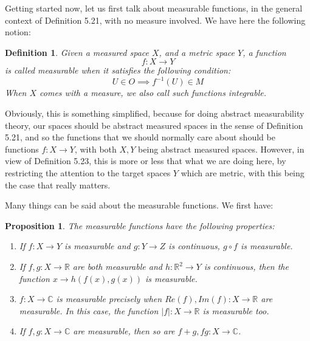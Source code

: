 \documentclass[12pt]{amsbook}
\newtheorem{definition}[theorem]{Definition}
\newtheorem{proposition}[theorem]{Proposition}
\begin{document}
\bigskip

Getting started now, let us first talk about measurable functions, in the general context of Definition 5.21, with no measure involved. We have here the following notion:

\begin{definition}
Given a measured space $X$, and a metric space $Y$, a function
$$f:X\to Y$$
is called measurable when it satisfies the following condition:
$$U\in O\implies f^{-1}(U)\in M$$
When $X$ comes with a measure, we also call such functions integrable.
\end{definition}

Obviously, this is something simplified, because for doing abstract measurability theory, our spaces should be abstract measured spaces in the sense of Definition 5.21, and so the functions that we should normally care about should be functions $f:X\to Y$, with both $X,Y$ being abstract measured spaces. However, in view of Definition 5.23, this is more or less that what we are doing here, by restricting the attention to the target spaces $Y$ which are metric, with this being the case that really matters.

\bigskip

Many things can be said about the measurable functions. We first have:

\begin{proposition}
The measurable functions have the following properties:
\begin{enumerate}
\item If $f:X\to Y$ is measurable and $g:Y\to Z$ is continuous, $g\circ f$ is measurable.

\item If $f,g:X\to\mathbb R$ are both measurable and $h:\mathbb R^2\to Y$ is continuous, then the function $x\to h(f(x),g(x))$ is measurable. 

\item $f:X\to\mathbb C$ is measurable precisely when $Re(f),Im(f):X\to\mathbb R$ are measurable. In this case, the function $|f|:X\to\mathbb R$ is measurable too.

\item If $f,g:X\to\mathbb C$ are measurable, then so are $f+g,fg:X\to\mathbb C$. 
\end{enumerate}
\end{proposition}
\end{document}
